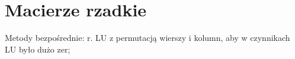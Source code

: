 \section{Macierze rzadkie}

\entry
Metody bezpośrednie:
r. LU z permutacją wierszy i kolumn, aby w czynnikach LU było dużo zer;


